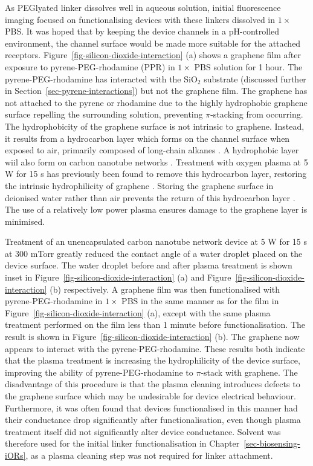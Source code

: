 \documentclass[
  a4paper,
]{scrbook}
\begin{document}
As PEGlyated linker dissolves well in aqueous solution, initial
fluorescence imaging focused on functionalising devices with these
linkers dissolved in \(1 \times\) PBS. It was hoped that by keeping the
device channels in a pH-controlled environment, the channel surface
would be made more suitable for the attached receptors.
Figure~\ref{fig-silicon-dioxide-interaction} (a) shows a graphene film
after exposure to pyrene-PEG-rhodamine (PPR) in \(1 \times\) PBS
solution for 1 hour. The pyrene-PEG-rhodamine has interacted with the
SiO\(_2\) substrate (discussed further in
Section~\ref{sec-pyrene-interactions}) but not the graphene film. The
graphene has not attached to the pyrene or rhodamine due to the highly
hydrophobic graphene surface repelling the surrounding solution,
preventing \(\pi\)-stacking from occurring. The hydrophobicity of the
graphene surface is not intrinsic to graphene. Instead, it results from
a hydrocarbon layer which forms on the channel surface when exposed to
air, primarily composed of long-chain alkanes
\autocite{Ashraf2014,Palinkas2022}. A hydrophobic layer wiil also form
on carbon nanotube networks \autocite{Stando2019,Park2022}. Treatment
with oxygen plasma at 5 W for 15 s has previously been found to remove
this hydrocarbon layer, restoring the intrinsic hydrophilicity of
graphene \autocite{Shin2010}. Storing the graphene surface in deionised
water rather than air prevents the return of this hydrocarbon layer
\autocite{Ashraf2014}. The use of a relatively low power plasma ensures
damage to the graphene layer is minimised.

Treatment of an unencapsulated carbon nanotube network device at 5 W for
15 s at 300 mTorr greatly reduced the contact angle of a water droplet
placed on the device surface. The water droplet before and after plasma
treatment is shown inset in Figure~\ref{fig-silicon-dioxide-interaction}
(a) and Figure~\ref{fig-silicon-dioxide-interaction} (b) respectively. A
graphene film was then functionalised with pyrene-PEG-rhodamine in
\(1 \times\) PBS in the same manner as for the film in
Figure~\ref{fig-silicon-dioxide-interaction} (a), except with the same
plasma treatment performed on the film less than 1 minute before
functionalisation. The result is shown in
Figure~\ref{fig-silicon-dioxide-interaction} (b). The graphene now
appears to interact with the pyrene-PEG-rhodamine. These results both
indicate that the plasma treatment is increasing the hydrophilicity of
the device surface, improving the ability of pyrene-PEG-rhodamine to
\(\pi\)-stack with graphene. The disadvantage of this procedure is that
the plasma cleaning introduces defects to the graphene surface which may
be undesirable for device electrical behaviour. Furthermore, it was
often found that devices functionalised in this manner had their
conductance drop significantly after functionalisation, even though
plasma treatment itself did not significantly alter device conductance.
Solvent was therefore used for the initial linker functionalisation in
Chapter~\ref{sec-biosensing-iORs}, as a plasma cleaning step was not
required for linker attachment.
\end{document}
